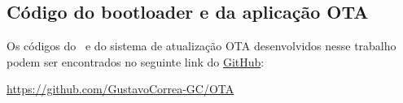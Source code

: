 
\begin{apendicesenv}
\partapendices

\chapter{Código do bootloader e da aplicação OTA} %
\label{chap:apendiceA}

Os códigos do \bootloader\ e do sistema de atualização OTA desenvolvidos nesse trabalho podem ser encontrados no seguinte link do \href{https://github.com/GustavoCorrea-GC/OTA}{GitHub}: 

\href{https://github.com/GustavoCorrea-GC/OTA}{https://github.com/GustavoCorrea-GC/OTA}


\end{apendicesenv}
